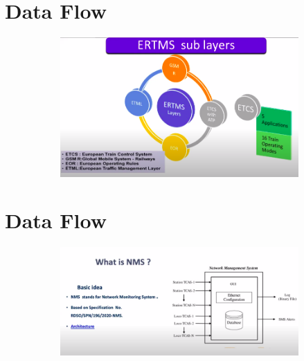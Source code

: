 \documentclass{beamer}
\begin{document}
\section{Data Flow}
\begin{frame}

\begin{figure}[h!]
  \centering
  \begin{subfigure}[b]{1\linewidth}
    \includegraphics[width=\linewidth]{./figs/KAVACH7.png}
  \end{subfigure}

\end{figure}

\end{frame}

\section{Data Flow}
\begin{frame}

\begin{figure}[h!]
  \centering
  \begin{subfigure}[b]{1\linewidth}
    \includegraphics[width=\linewidth]{./figs/KAVACH8.png}
  \end{subfigure}

\end{figure}

\end{frame}
\end{document}
